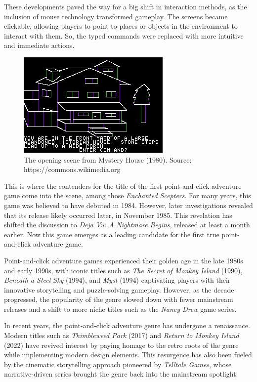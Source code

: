 These developments paved the way for a big shift in interaction methods, as the inclusion of mouse technology transformed gameplay. The screens became clickable, allowing players to point to places or objects in the environment to interact with them. So, the typed commands were replaced with more intuitive and immediate actions.


\begin{figure}[H]
\centering
\includegraphics{img/Mystery_House.png}
\caption{The opening scene from Mystery House (1980). Source: https://commons.wikimedia.org\cite{wiki:MysteryHouse}}
\label{fig:MH}
\end{figure}

This is where the contenders for the title of the first point-and-click adventure game come into the scene, among those \textit{Enchanted Scepters}. For many years, this game was believed to have debuted in 1984. However, later investigations revealed that its release likely occurred later, in November 1985. This revelation has shifted the discussion to \textit{Deja Vu: A Nightmare Begins}, released at least a month earlier. Now this game emerges as a leading candidate for the first true point-and-click adventure game\cite{Pfenning2024}.

Point-and-click adventure games experienced their golden age in the late 1980s and early 1990s, with iconic titles such as \textit{The Secret of Monkey Island} (1990), \textit{Beneath a Steel Sky} (1994), and \textit{Myst} (1994) captivating players with their innovative storytelling and puzzle-solving gameplay. However, as the decade progressed, the popularity of the genre slowed down\cite{Qaffas202022} with fewer mainstream releases and a shift to more niche titles such as the \textit{Nancy Drew} game series.

In recent years, the point-and-click adventure genre has undergone a renaissance. Modern titles such as \textit{Thimbleweed Park} (2017) and \textit{Return to Monkey Island} (2022) have revived interest by paying homage to the retro roots of the genre while implementing modern design elements. This resurgence has also been fueled by the cinematic storytelling approach pioneered by \textit{Telltale Games}, whose narrative-driven series brought the genre back into the mainstream spotlight.

